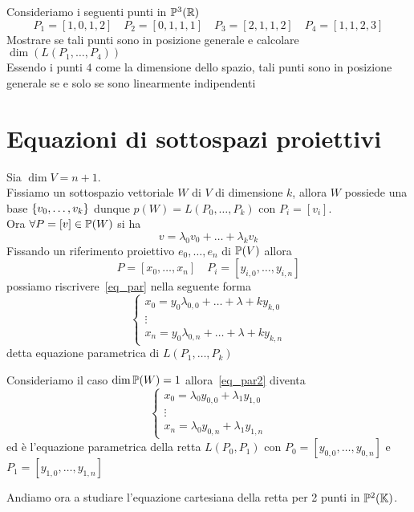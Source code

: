 \spazio
\begin{ese}Consideriamo i seguenti punti in $\mathbb{P}^3 (\mathbb{R})$
$$ P_1=[ 1,0,1,2]\quad P_2=[0,1,1,1]\quad P_3=[2,1,1,2]\quad P_4=[1,1,2,3]$$
Mostrare se tali punti sono in posizione generale e calcolare $\dim(L(P_1, \dots, P_4))$\\
Essendo i punti $4$ come la dimensione dello spazio, tali punti sono in posizione generale se e solo se sono linearmente indipendenti
\end{ese}
\newpage
\section{Equazioni di sottospazi proiettivi}
Sia $\dim V = n+1$.\\
Fissiamo un sottospazio vettoriale $W$ di $V$ di dimensione $k$, allora $W$ possiede una base $\left\{  v_0, \dots , v_k \right\}$ dunque $p(W) = L(P_0, \dots, P_k)$ con $P_i=[v_i]$.\\
Ora $\forall P=[v]\in \mathbb{P}(W)$ si ha 
\begin{equation}
\label{eq_par}
 v= \lambda_0 v_0+ \dots + \lambda_k v_k
 \end{equation}
Fissando un riferimento proiettivo $e_0, \dots, e_n$ di $\mathbb{P}(V)$ allora
$$ P=[x_0, \dots , x_n]\quad P_i=[y_{i,0}, \dots, y_{i,n}]$$
possiamo riscrivere~\ref{eq_par} nella seguente forma 
\begin{equation}
\label{eq_par2}
\begin{cases} x_0 = y_0 \lambda_{0,0} +\dots + \lambda+k y_{k,0} \\
\vdots \\
 x_n = y_0 \lambda_{0,n} +\dots + \lambda+k y_{k,n} 
 \end{cases}
 \end{equation}
 detta equazione parametrica di $L(P_1, \dots,P_k)$
\begin{ese} Consideriamo il caso $\dim \mathbb{P}(W)=1$ allora~\ref{eq_par2} diventa
$$\begin{cases} x_0 = \lambda_0 y_{0,0} + \lambda_1 y_{1,0} \\
\vdots \\
x_n =\lambda_0 y_{0,n} + \lambda_1 y_{1,n}
\end{cases}$$
ed \`e l'equazione parametrica della retta $L(P_0, P_1)$ con $P_0=[y_{0,0}, \dots, y_{0,n}]$ e $P_1 =[ y_{1,0}, \dots, y_{1,n}]$
\end{ese}
\spazio
Andiamo ora a studiare l'equazione cartesiana della retta per 2 punti in $\mathbb{P}^2(\mathbb{K})$.\\
